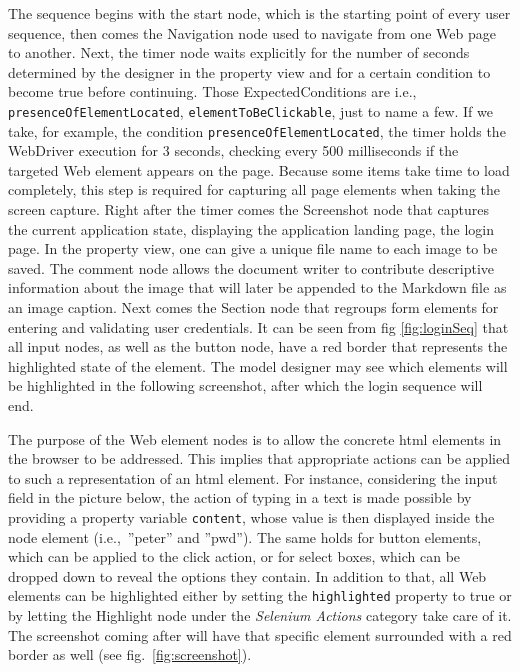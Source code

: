 The sequence begins with the start node, which is the starting point of every user sequence, then comes the Navigation node used to navigate from one Web page to another. Next, the timer node waits explicitly for the number of seconds determined by the designer in the property view and for a certain condition to become true before continuing. Those ExpectedConditions are i.e., \lstinline{presenceOfElementLocated}, \lstinline{elementToBeClickable}, just to name a few. If we take, for example, the condition \lstinline{presenceOfElementLocated}, the timer holds the WebDriver execution for 3 seconds, checking every 500 milliseconds if the targeted Web element appears on the page. Because some items take time to load completely, this step is required for capturing all page elements when taking the screen capture. Right after the timer comes the Screenshot node that captures the current application state, displaying the application landing page, the login page. In the property view, one can give a unique file name to each image to be saved. The comment node allows the document writer to contribute descriptive information about the image that will later be appended to the Markdown file as an image caption. Next comes the Section node that regroups form elements for entering and validating user credentials. It can be seen from fig \ref{fig:loginSeq} that all input nodes, as well as the button node, have a red border that represents the highlighted state of the element. The model designer may see which elements will be highlighted in the following screenshot, after which the login sequence will end. 

The purpose of the Web element nodes is to allow the concrete \gls*{html} elements in the browser to be addressed. This implies that appropriate actions can be applied to such a representation of an \gls*{html} element. For instance, considering the input field in the picture below, the action of typing in a text is made possible by providing a property variable \lstinline{content}, whose value is then displayed inside the node element (i.e.,~''peter'' and ''pwd''). The same holds for button elements, which can be applied to the click action, or for select boxes, which can be dropped down to reveal the options they contain. In addition to that, all Web elements can be highlighted either by setting the \lstinline{highlighted} property to true or by letting the Highlight node under the \textit{Selenium Actions} category take care of it. The screenshot coming after will have that specific element surrounded with a red border as well (see fig.~\ref{fig:screenshot}).

